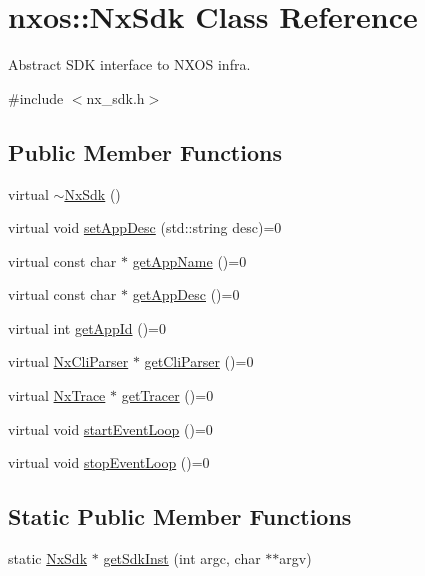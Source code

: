 \hypertarget{classnxos_1_1NxSdk}{
\section{nxos::NxSdk Class Reference}
\label{classnxos_1_1NxSdk}
}


Abstract SDK interface to NXOS infra.  


{\ttfamily \#include $<$nx\_\-sdk.h$>$}\subsection*{Public Member Functions}
\begin{DoxyCompactItemize}
\item 
virtual \hyperlink{classnxos_1_1NxSdk_a6b5028045019af4be6c8356ec0fdaff9}{$\sim$NxSdk} ()
\item 
virtual void \hyperlink{classnxos_1_1NxSdk_a2c6007a383114285951b2d2a062dacec}{setAppDesc} (std::string desc)=0
\item 
virtual const char $\ast$ \hyperlink{classnxos_1_1NxSdk_a9ba7da2cd8cb4f82438135ee651efdb0}{getAppName} ()=0
\item 
virtual const char $\ast$ \hyperlink{classnxos_1_1NxSdk_ad6964fa8ee52a8b0a22c27abdcf871e3}{getAppDesc} ()=0
\item 
virtual int \hyperlink{classnxos_1_1NxSdk_ac82af6d262439275f27c745082bf3fd7}{getAppId} ()=0
\item 
virtual \hyperlink{classnxos_1_1NxCliParser}{NxCliParser} $\ast$ \hyperlink{classnxos_1_1NxSdk_a98bcb70d1bf60e38b41eacdf0a72dc89}{getCliParser} ()=0
\item 
virtual \hyperlink{classnxos_1_1NxTrace}{NxTrace} $\ast$ \hyperlink{classnxos_1_1NxSdk_ad2c729bd12d1b9f4bf06f4b70fe28347}{getTracer} ()=0
\item 
virtual void \hyperlink{classnxos_1_1NxSdk_a75ca70643fe325ddf0eea62c1f8c4cc8}{startEventLoop} ()=0
\item 
virtual void \hyperlink{classnxos_1_1NxSdk_adc80e6f244a7cbc050f9dacbc8018315}{stopEventLoop} ()=0
\end{DoxyCompactItemize}
\subsection*{Static Public Member Functions}
\begin{DoxyCompactItemize}
\item 
static \hyperlink{classnxos_1_1NxSdk}{NxSdk} $\ast$ \hyperlink{classnxos_1_1NxSdk_a5050e2d26c40744b4fc7862068a83f39}{getSdkInst} (int argc, char $\ast$$\ast$argv)
\end{DoxyCompactItemize}


